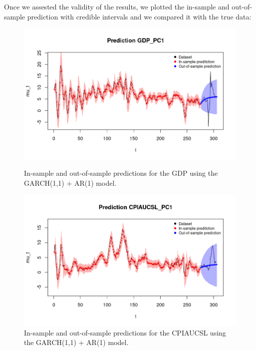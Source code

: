 Once we assested the validity of the results, we plotted the in-sample and out-of-sample prediction with credible intervals and we compared it with the true data:
\begin{figure}[H]
    \centering
    \begin{minipage}{0.49\textwidth}
        \centering
        \includegraphics[width=\textwidth]{images/5-GARCH/gdp_prediction.png}
        \caption{In-sample and out-of-sample predictions for the GDP using the GARCH(1,1) + AR(1) model.}
        \label{fig:GARCH1,1_AR1_gdp_prediction} 
    \end{minipage}\hfill
    \begin{minipage}{0.49\textwidth}
        \centering
        \includegraphics[width=\textwidth]{images/5-GARCH/infl_prediction.png}
        \caption{In-sample and out-of-sample predictions for the CPIAUCSL using the GARCH(1,1) + AR(1) model.}
        \label{fig:GARCH1,1_AR1_infl_prediction}
    \end{minipage}
\end{figure}
